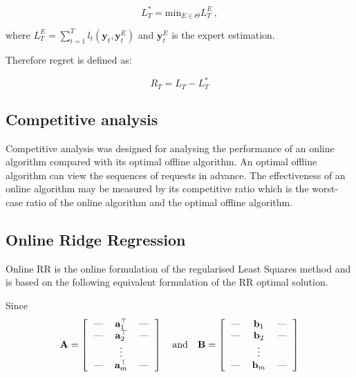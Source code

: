 \begin{equation*}
L^*_T= \text{min}_{E \in \Theta} L_T^E \, ,
\end{equation*}

\noindent where $L_T^E = \sum_{t=1}^T
l_t(\mathbf{y}_t,\mathbf{y}^E_t)$ and $\mathbf{y}^E_t$ is the expert estimation. 

Therefore regret is defined as:

\begin{equation*}
R_T = L_T - L^*_T
\end{equation*}

\subsection{Competitive analysis}

Competitive analysis was designed for analysing the performance of an online algorithm compared with its optimal offline algorithm. An optimal offline algorithm can view the sequences of requests in advance. The effectiveness of an online algorithm \cite{sleator1985} may be measured by its competitive ratio which is the worst-case ratio of the online algorithm and the optimal offline algorithm.



\subsection{Online Ridge Regression}

Online RR is the online formulation of the regularised Least Squares method
and is based on the following equivalent formulation of the RR optimal solution.

Since 
\begin{equation}
\label{eq:notation}
	\mathbf{A} = 
\left[
  \begin{tabular}{c>{$}c<{$}c}
    --- & \mathbf{a}^{\top}_{1} & ---\\
    --- & \mathbf{a}^{\top}_{2} & ---\\
    & \vdots & \\
    --- & \mathbf{a}^{\top}_{m} & ---
  \end{tabular}
\right]
\quad \text{and} \quad
\mathbf{B} =
\left[
  \begin{tabular}{c>{$}c<{$}c}
    --- & \mathbf{b}_{1} & ---\\
    --- & \mathbf{b}_{2} & ---\\
    & \vdots & \\
    --- & \mathbf{b}_{m} & ---
  \end{tabular}
\right]
\end{equation}

